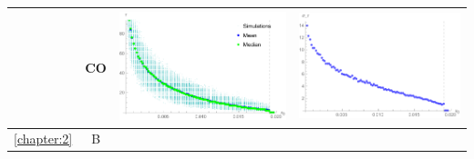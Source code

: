 \begin{table}[!htb]
\begin{tabular}{c|c|c|c}
		& CO & 
		\begin{minipage}{.4\textwidth}
			\includegraphics[width=\linewidth]{StopTime/1_COMtau.pdf}
		\end{minipage}
		& \begin{minipage}{.4\textwidth}
			\includegraphics[width=\linewidth]{StopTime/1_COMsd.pdf}
		\end{minipage} 
	 \\ \hline
		\multirow{11}{*}{ \ref{chapter:2}} & B & 
			\begin{minipage}{.4\textwidth}
			\includegraphics[width=\linewidth]

\end{minipage}
\end{tabular}
\end{table}
